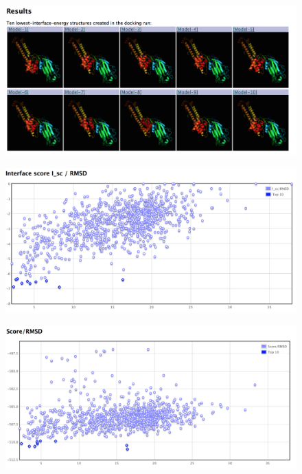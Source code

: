 \documentclass{article}
\begin{document}
\begin{figure}
\centering

\begin{minipage}{1.00\textwidth}

  \centering
  \includegraphics[width=.9\linewidth]{rosetta_decoys}
  \label{fig:test2}

  \centering
  \includegraphics[width=.9\linewidth]{rosetta_interface_rmsd}
  \label{fig:test2}
  
  \centering
  \includegraphics[width=.9\linewidth]{rosetta_rmsd}
  \label{fig:test2}
\end{minipage}

\end{figure}
\end{document}

